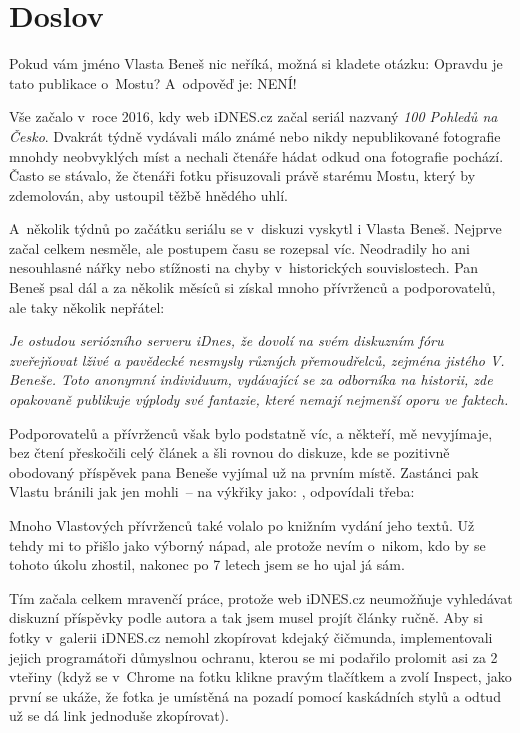 \chapter{Doslov}

Pokud vám jméno Vlasta Beneš nic neříká, možná si kladete otázku: Opravdu je
tato publikace o~Mostu? A~odpověď je: NENÍ!

Vše začalo v~roce 2016, kdy web iDNES.cz začal seriál nazvaný {\em 100 Pohledů
na Česko}. Dvakrát týdně vydávali málo známé nebo nikdy nepublikované
fotografie mnohdy neobvyklých míst a nechali čtenáře hádat odkud ona fotografie
pochází. Často se stávalo, že čtenáři fotku přisuzovali právě starému Mostu,
který by zdemolován, aby ustoupil těžbě hnědého uhlí.

A~několik týdnů po začátku seriálu se v~diskuzi vyskytl i Vlasta Beneš. Nejprve
začal celkem nesměle, ale postupem času se rozepsal víc. Neodradily ho ani
nesouhlasné nářky  nebo stížnosti na chyby v~historických souvislostech. Pan
Beneš psal dál a za několik měsíců si získal mnoho přívrženců a podporovatelů,
ale taky několik nepřátel:

{\it Je ostudou seriózního serveru iDnes, že dovolí na svém diskuzním fóru
zveřejňovat lživé a pavědecké nesmysly různých přemoudřelců, zejména jistého V.
Beneše. Toto anonymní individuum, vydávající se za odborníka na historii, zde
opakovaně publikuje výplody své fantazie, které nemají nejmenší oporu ve
faktech.}

Podporovatelů a přívrženců však bylo podstatně víc, a někteří, mě nevyjímaje,
bez čtení přeskočili celý článek a šli rovnou do diskuze, kde se pozitivně
obodovaný příspěvek pana Beneše vyjímal už na prvním místě. Zastánci pak Vlastu
bránili jak jen mohli~-- na výkřiky jako: , odpovídali třeba: 

Mnoho Vlastových přívrženců také volalo po knižním vydání jeho textů. Už tehdy
mi to přišlo jako výborný nápad, ale protože nevím o~nikom, kdo by se tohoto
úkolu zhostil, nakonec po 7 letech jsem se ho ujal já sám.

Tím začala celkem mravenčí práce, protože web iDNES.cz neumožňuje vyhledávat
diskuzní příspěvky podle autora a tak jsem musel projít články ručně. Aby si
fotky v~galerii iDNES.cz nemohl zkopírovat kdejaký čičmunda, implementovali
jejich programátoři důmyslnou ochranu, kterou se mi podařilo prolomit asi za 2
vteřiny (když se v~Chrome na fotku klikne pravým tlačítkem a zvolí Inspect,
jako první se ukáže, že fotka je umístěná na pozadí pomocí kaskádních stylů a
odtud už se dá link jednoduše zkopírovat).

